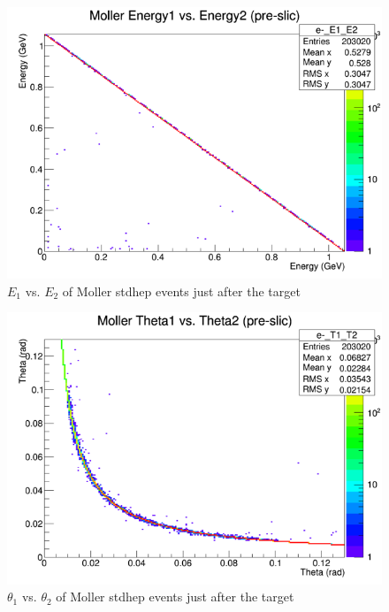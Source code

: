 \documentclass{article}
\begin{document}
	\begin{figure}[H]
  	\includegraphics[width=\linewidth]{old/stdEE.png}
  	\caption{$E_1$ vs. $E_2$ of Moller stdhep events just after the target}
  	\label{fig:stdEE}
	\end{figure}
	
	\begin{figure}[H]
  	\includegraphics[width=\linewidth]{old/stdTT.png}
  	\caption{$\theta_1$ vs. $\theta_2$ of Moller stdhep events just after the target}
  	\label{fig:stdTT}
	\end{figure}
	
\end{document}
